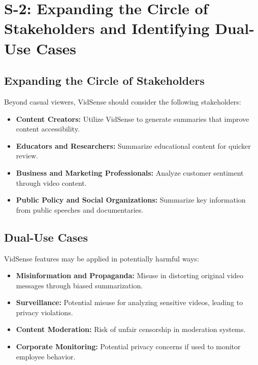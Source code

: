 \documentclass{bscs}
\begin{document}
\section{S-2: Expanding the Circle of Stakeholders and Identifying Dual-Use Cases}

\subsection{Expanding the Circle of Stakeholders}

Beyond casual viewers, VidSense should consider the following stakeholders:

\begin{itemize}
    \item \textbf{Content Creators:} Utilize VidSense to generate summaries that improve content
accessibility. 
    
    \item \textbf{Educators and Researchers:} Summarize educational content for quicker review. 

    \item \textbf{Business and Marketing Professionals:} Analyze customer sentiment through video
content. 

    \item \textbf{Public Policy and Social Organizations:} Summarize key information from public
speeches and documentaries.  

\end{itemize}

\subsection{Dual-Use Cases}

VidSense features may be applied in potentially harmful ways: 

\begin{itemize}
    \item \textbf{Misinformation and Propaganda:} Misuse in distorting original video messages through biased summarization. 
    
    \item \textbf{Surveillance:} Potential misuse for analyzing sensitive videos, leading to privacy violations.  

    \item \textbf{Content Moderation:}  Risk of unfair censorship in moderation systems.

    \item \textbf{Corporate Monitoring:} Potential privacy concerns if used to monitor employee
behavior.
    
\end{itemize}
\end{document}
